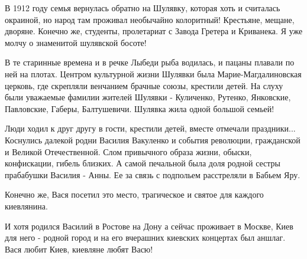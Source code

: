 В 1912 году семья вернулась обратно на Шулявку, которая хоть и считалась
окраиной, но народ там проживал необычайно колоритный! Крестьяне, мещане,
дворяне. Конечно же, студенты, пролетариат с Завода Гретера и Криванека. Я уже
молчу о знаменитой шулявской босоте!

В те старинные времена и в речке Лыбеди рыба водилась, и пацаны плавали по ней
на плотах. Центром культурной жизни Шулявки была Марие-Магдалиновская церковь,
где скрепляли венчанием брачные союзы, крестили детей. На слуху были уважаемые
фамилии жителей Шулявки - Куличенко, Рутенко, Янковские, Павловские, Габеры,
Балтушевичи. Шулявка жила одной большой семьей!

Люди ходил к друг другу в гости, крестили детей, вместе отмечали праздники...
Коснулись далекой родни Василия Вакуленко и события революции, гражданской и
Великой Отечественной. Слом привычного образа жизни, обыски, конфискации,
гибель близких. А самой печальной была доля родной сестры прабабушки Василия -
Анны. Ее за связь с подпольем расстреляли в Бабьем Яру.

Конечно же, Вася посетил это место, трагическое и святое для каждого
киевлянина.

И хотя родился Василий в Ростове на Дону а сейчас проживает в Москве, Киев для
него - родной город и на его вчерашних киевских концертах был аншлаг. Вася
любит Киев, киевляне любят Васю!

